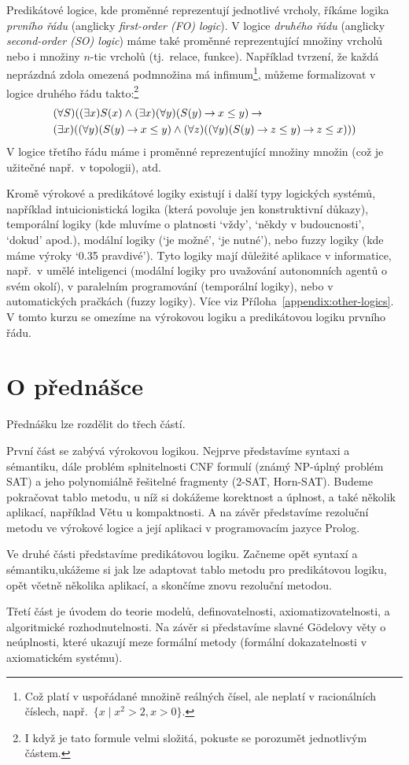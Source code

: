 Predikátové logice, kde proměnné reprezentují jednotlivé vrcholy, říkáme logika \emph{prvního řádu} (anglicky  \emph{first-order (FO) logic}). V logice \emph{druhého řádu} (anglicky \emph{second-order (SO) logic}) máme také proměnné reprezentující množiny vrcholů nebo i množiny \(n\)-tic vrcholů (tj.\ relace, funkce). Například tvrzení, že každá neprázdná zdola omezená podmnožina má infimum\footnote{Což platí v uspořádané množině reálných čísel, ale neplatí v racionálních číslech, např.\ \( \{x \mid x^2 > 2, x > 0\} \).}, můžeme formalizovat v logice druhého řádu takto:\footnote{I když je tato formule velmi složitá, pokuste se porozumět jednotlivým částem.}
\begin{align*}
&(\forall S)((\exists x)S(x) \land (\exists x)(\forall y)(S(y) \mathbin{\rightarrow} x\leq y) \mathbin{\rightarrow}  {}\\ 
&(\exists x)((\forall y)(S(y) \mathbin{\rightarrow} x\leq y) \land (\forall z)((\forall y)(S(y) \mathbin{\rightarrow} z\leq y)\mathbin{\rightarrow} z\leq x)))
\end{align*}
V logice třetího řádu máme i proměnné reprezentující množiny množin (což je užitečné např.\ v topologii), atd.

Kromě výrokové a predikátové logiky existují i další typy logických systémů, například intuicionistická logika (která povoluje jen konstruktivní důkazy), temporální logiky (kde mluvíme o platnosti `vždy', `někdy v budoucnosti', `dokud' apod.), modální logiky (`je možné', `je nutné'), nebo fuzzy logiky (kde máme výroky `0.35 pravdivé'). Tyto logiky mají důležité aplikace v informatice, např.\ v umělé inteligenci (modální logiky pro uvažování autonomních agentů o svém okolí), v paralelním programování (temporální logiky), nebo v automatických pračkách (fuzzy logiky). Více viz Příloha~\ref{appendix:other-logics}. V tomto kurzu se omezíme na výrokovou logiku a predikátovou logiku prvního řádu.


\section{O přednášce}

Přednášku lze rozdělit do třech částí. 

První část se zabývá výrokovou logikou. Nejprve představíme syntaxi a sémantiku, dále problém splnitelnosti CNF formulí (známý NP-úplný problém SAT) a jeho polynomiálně řešitelné fragmenty (2-SAT, Horn-SAT). Budeme pokračovat tablo metodu, u níž si dokážeme korektnost a úplnost, a také několik aplikací, například Větu u kompaktnosti. A na závěr představíme rezoluční metodu ve výrokové logice a její aplikaci v programovacím jazyce Prolog. 

Ve druhé části představíme predikátovou logiku. Začneme opět syntaxí a sémantiku,ukážeme si jak lze adaptovat tablo metodu pro predikátovou logiku, opět včetně několika aplikací, a skončíme znovu rezoluční metodou. 

Třetí část je úvodem do teorie modelů, definovatelnosti, axiomatizovatelnosti, a algoritmické rozhodnutelnosti. Na závěr si představíme slavné Gödelovy věty o neúplnosti, které ukazují meze formální metody (formální dokazatelnosti v axiomatickém systému).


